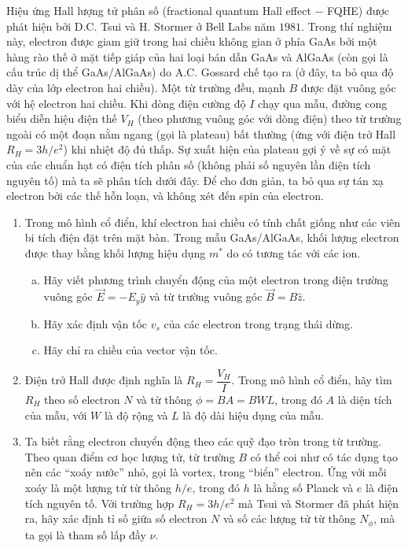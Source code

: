 \begin{vd} %
Hiệu ứng Hall lượng tử phân số (fractional quantum Hall effect $-$ FQHE) được phát hiện bởi D.C. Tsui và H. Stormer ở Bell Labs năm $1981$. Trong thí nghiệm này, electron được giam giữ trong hai chiều không gian ở phía GaAs bởi một hàng rào thế ở mặt tiếp giáp của hai loại bán dẫn GaAs và AlGaAs (còn gọi là cấu trúc dị thể GaAs/AlGaAs) do A.C. Gossard chế tạo ra (ở đây, ta bỏ qua độ dày của lớp electron hai chiều). Một từ trường đều, mạnh $B$ được đặt vuông góc với hệ electron hai chiều. Khi dòng điện cường độ $I$ chạy qua mẫu, đường cong biểu diễn hiệu điện thế $V_{H}$ (theo phương vuông góc với dòng điện) theo từ trường ngoài có một đoạn nằm ngang (gọi là plateau) bất thường (ứng với điện trở Hall $R_{H}=3h/e^2$) khi nhiệt độ đủ thấp. Sự xuất hiện của plateau gợi ý về sự có mặt của các chuẩn hạt có điện tích phân số (không phải số nguyên lần điện tích nguyên tố) mà ta sẽ phân tích dưới đây. Để cho đơn giản, ta bỏ qua sự tán xạ electron bởi các thế hỗn loạn, và không xét đến spin của electron. 
\begin{enumerate}[1) ]
    \item Trong mô hình cổ điển, khí electron hai chiều có tính chất giống như các viên bi tích điện đặt trên mặt bàn. Trong mẫu GaAs/AlGaAs, khối lượng electron được thay bằng khối lượng hiệu dụng  $m^{\ast}$ do có tương tác với các ion.
    \begin{enumerate}[a) ]
        \item Hãy viết phương trình chuyển động của một electron trong điện trường vuông góc $\overrightarrow{E}=-E_{y}\widehat{y}$ và từ trường vuông góc $\overrightarrow{B}=B\widehat{z}$.
        \item Hãy xác định vận tốc $v_{s}$ của các electron trong trạng thái dừng.
        \item Hãy chỉ ra chiều của vector vận tốc.
    \end{enumerate}
    \item Điện trở Hall được định nghĩa là $R_{H}=\dfrac{V_{H}}{I}$. Trong mô hình cổ điển, hãy tìm $R_{H}$ theo số electron $N$ và từ thông $\phi=BA=BWL$, trong đó $A$ là diện tích của mẫu, với $W$ là độ rộng và $L$ là độ dài hiệu dụng của mẫu.
    \item Ta biết rằng electron chuyển động theo các quỹ đạo tròn trong từ trường. Theo quan điểm cơ học lượng tử, từ trường $B$ có thể coi như có tác dụng tạo nên các ``xoáy nước'' nhỏ, gọi là vortex, trong ``biển'' electron. Ứng với mỗi xoáy là một lượng tử từ thông $h/e$, trong đó $h$ là  hằng số Planck và $e$ là điện tích nguyên tố. Với trường hợp $R_{H}=3h/e^2$ mà Tsui và Stormer đã phát hiện ra, hãy xác định tỉ số giữa số electron $N$ và số các lượng tử từ thông $N_{\phi}$, mà ta gọi là tham số lấp đầy $\nu$. 
\end{enumerate}
\end{vd}
